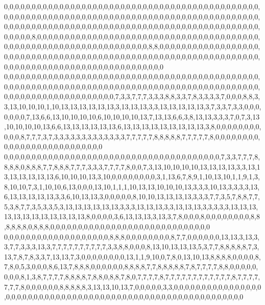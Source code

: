 0,0,0,0,0,0,0,0,0,0,0,0,0,0,0,0,0,0,0,0,0,0,0,0,0,0,0,0,0,0,0,0,0,0,0,0,0,0,0,0,0,0,0,0,0,0,0,0,0,0,0,0,0,0,0,0,0,0,0,0,0,0,0,0,0,0,0,0,0,0,0,0,0,0,0,0,0,0,0,0,0,0,0,0,0,0,0,0,0,0,0,0,0,0,0,0,0,0,0,0,0,0,0,0,0,0,0,0,0,0,0,0,0,0,0,0,0,0,0,0,0,0,0,0,0,0,0,0,0,0,0,0,0,0,0,0,0,0,0,0,0,0,0,8,0,0,0,0,0,0,0,0,0,0,0,0,0,0,0,0,0,0,0,0,0,0,0,0,0,0,0,0,0,0,0,0,0,0,0,0,0,0,0,0,0,0,0,0,0,0,0,0,0,0,0,0,0,0,0,0,0,0,0,0,0,0,0,0,0,0,8,8,0,0,0,0,0,0,0,0,0,0,0,0,0,0,0,0,0,0,0,0,0,0,0,0,0,0,0,0,0,0,0,0,0,0,0,0,0,0,0,0,0,0,0,0,0,0,0,0,0,0,0,0,0,0,0,0,0,0,0,0,0,0,0,0,0,0,0,0,0,0,0,0,0,0,0,0,0,0,0,0,0,0,0,0,0,0,0,0,0,0,0,0,0
0,0,0,0,0,0,0,0,0,0,0,0,0,0,0,0,0,0,0,0,0,0,0,0,0,0,0,0,0,0,0,0,0,0,0,0,0,0,0,0,0,0,0,0,0,0,0,0,0,0,0,0,0,0,0,0,0,0,0,0,0,0,0,0,0,0,0,0,0,0,0,0,0,0,0,0,0,0,0,0,0,0,0,0,0,0,0,0,0,0,0,0,0,0,0,0,0,0,0,0,0,0,0,0,0,0,0,0,0,0,0,0,7,3,3,7,7,7,3,3,3,8,8,3,3,7,8,3,3,3,3,7,0,0,0,8,8,3,3,13,10,10,10,1,10,13,13,13,13,13,13,3,13,13,13,3,3,13,13,13,13,13,3,7,3,3,7,3,3,0,0,0,0,0,0,0,7,13,6,6,13,10,10,10,10,6,10,10,10,10,13,7,13,13,6,6,3,8,13,13,3,3,3,7,0,7,3,13,10,10,10,10,13,6,6,13,13,13,13,13,13,6,13,13,13,13,13,13,13,13,13,3,8,0,0,0,0,0,0,0,0,0,0,0,8,7,7,7,3,7,3,3,3,3,3,3,3,3,3,3,3,3,3,7,7,7,7,7,8,8,8,8,8,7,7,7,7,7,8,0,0,0,0,0,0,0,0,0,0,0,0,0,0,0,0,0,0,0,0,0,0,0,0,0,0
0,0,0,0,0,0,0,0,0,0,0,0,0,0,0,0,0,0,0,0,0,0,0,0,0,0,0,0,0,0,0,0,0,0,0,0,0,0,0,7,3,3,7,7,7,8,8,8,8,0,8,8,8,7,7,8,8,8,7,7,7,3,3,3,7,7,7,7,8,0,0,7,3,13,10,10,10,10,13,13,13,13,3,3,13,13,13,13,13,13,13,6,10,10,10,13,3,10,0,0,0,0,0,0,0,0,3,1,13,6,7,8,9,1,10,13,10,1,1,9,1,3,8,10,10,7,3,1,10,10,6,13,0,0,0,13,10,1,1,1,10,13,13,10,10,10,13,3,3,3,10,13,3,3,3,3,13,6,13,13,13,13,13,3,3,6,10,13,13,3,0,0,0,0,0,8,10,10,13,13,13,13,3,3,3,7,7,3,5,7,8,8,7,7,5,3,8,7,7,3,5,3,3,5,3,13,13,13,13,13,13,3,3,3,13,13,13,3,3,13,13,13,3,3,3,3,3,13,13,13,13,13,13,13,13,13,13,13,13,8,0,0,0,0,3,6,13,13,13,3,13,3,7,8,0,0,0,8,0,0,0,0,0,0,0,0,8,8,8,8,8,8,0,8,8,8,0,0,0,0,0,0,0,0,0,0,0,0,0,0,0,0,0,0,0,0,0,0,0,0,0,0,0,0,0
0,0,0,0,0,0,0,0,0,0,0,0,0,0,0,0,0,0,0,8,8,8,0,0,0,0,0,0,0,0,8,7,7,0,0,0,0,0,0,13,13,3,13,3,3,7,7,3,3,3,13,3,7,7,7,7,7,7,7,7,7,7,3,3,8,8,0,0,0,8,13,10,13,13,13,5,3,7,7,8,8,8,8,8,7,3,13,7,8,7,8,3,3,7,13,13,7,3,0,0,0,0,0,0,0,0,13,1,1,9,10,0,7,8,0,13,10,13,8,8,8,8,0,0,0,0,8,7,8,0,5,3,0,0,0,8,6,13,7,8,8,8,0,0,0,0,0,0,8,8,8,8,7,7,8,8,8,8,8,7,8,7,7,7,7,8,8,0,0,0,0,0,0,0,0,8,1,3,8,7,7,7,7,8,8,8,8,7,8,8,0,8,8,7,8,0,7,7,7,7,8,7,7,7,7,7,7,7,7,7,7,7,7,8,7,7,7,7,7,7,7,8,0,0,0,0,0,0,8,8,8,8,8,3,13,13,10,13,7,0,0,0,0,0,3,3,0,0,0,0,0,0,0,0,0,0,0,0,0,0,0,0,0,0,0,0,0,0,0,0,0,0,0,0,0,0,0,0,0,0,0,0,0,0,0,0,0,0,0,0,0,0,0,0,0,0,0,0,0,0,0,0,0,0,0
